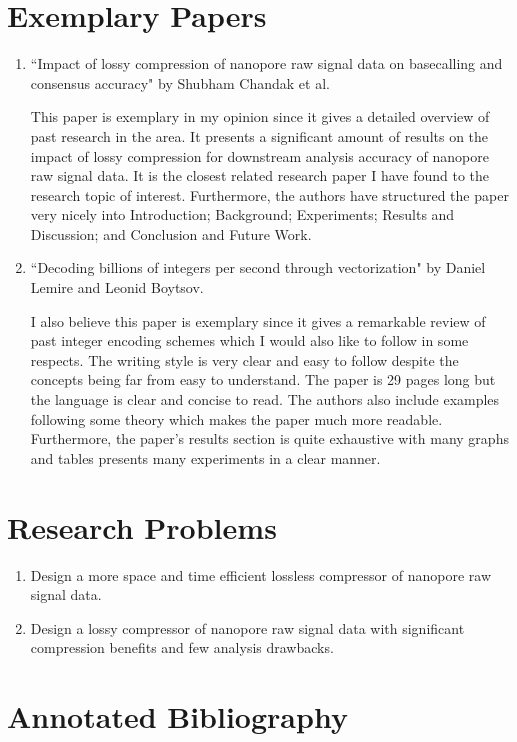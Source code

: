 \documentclass[a4paper, 12pt]{article}
\begin{document}
\section{Exemplary Papers}
\begin{enumerate}
	\item ``Impact of lossy compression of nanopore raw signal data on basecalling and consensus accuracy" by Shubham Chandak et al.

		This paper is exemplary in my opinion since it gives a detailed overview of past research in the area. It presents a significant amount of results on the impact of lossy compression for downstream analysis accuracy of nanopore raw signal data. It is the closest related research paper I have found to the research topic of interest. Furthermore, the authors have structured the paper very nicely into Introduction; Background; Experiments; Results and Discussion; and Conclusion and Future Work.

	\item ``Decoding billions of integers per second through vectorization" by Daniel Lemire and Leonid Boytsov.

		I also believe this paper is exemplary since it gives a remarkable review of past integer encoding schemes which I would also like to follow in some respects. The writing style is very clear and easy to follow despite the concepts being far from easy to understand. The paper is 29 pages long but the language is clear and concise to read. The authors also include examples following some theory which makes the paper much more readable. Furthermore, the paper's results section is quite exhaustive with many graphs and tables presents many experiments in a clear manner.
\end{enumerate}

\section{Research Problems}
\begin{enumerate}
	\item Design a more space and time efficient lossless compressor of nanopore raw signal data.
	\item Design a lossy compressor of nanopore raw signal data with significant compression benefits and few analysis drawbacks.
\end{enumerate}

\section{Annotated Bibliography}

\nocite{mcdrc,simd-pfor,picopore,genomic-comp,genozip}
\nocite{lossy-nano,lfzip}



\end{document}
